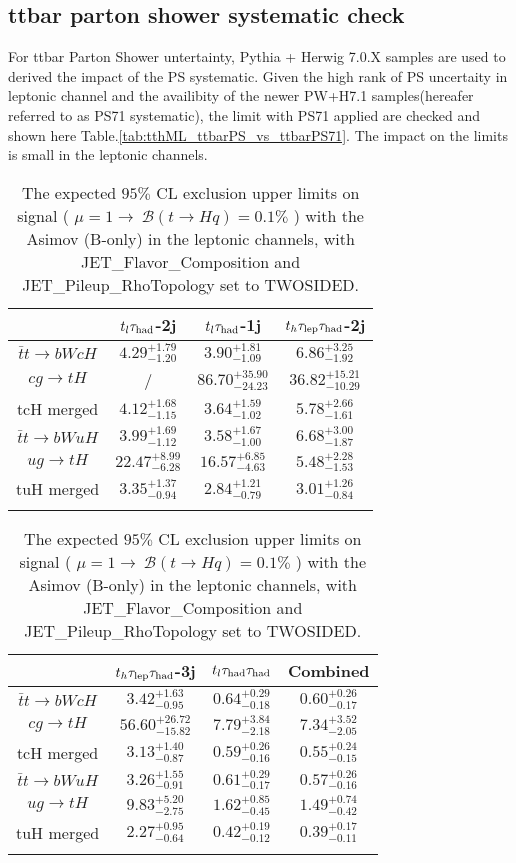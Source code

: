 \subsection{ ttbar parton shower systematic check}
For ttbar Parton Shower untertainty, Pythia + Herwig 7.0.X samples are used to derived the impact of the PS systematic. Given the high rank of PS uncertaity in leptonic channel and the availibity of the newer PW+H7.1 samples(hereafer referred to as PS71 systematic), the limit with PS71 applied are checked and shown here Table.\ref{tab:tthML_ttbarPS_vs_ttbarPS71}. The impact on the limits is small in the leptonic channels. 

\begin{table}[H]
\caption{The expected $95\%$ CL exclusion upper limits on signal ( $\mu=1\to~\mathcal{B}(t\to Hq)=0.1\%$ ) with the Asimov (B-only) in the leptonic channels,  with JET\_Flavor\_Composition and JET\_Pileup\_RhoTopology set to TWOSIDED.}
\label{tab:tthML_max_vs_twosided}
\centering
\begin{tabular}{cccc} \toprule\toprule
 & $t_l\tau_\text{had}$-2j & $t_l\tau_\text{had}$-1j & $t_h\tau_\text{lep}{}\tau_\text{had}$-2j\\\midrule
$\bar{t}t\to bWcH$ & $4.29^{+1.79}_{-1.20}$ & $3.90^{+1.81}_{-1.09}$ & $6.86^{+3.25}_{-1.92}$\\
$cg\to tH$ &  / & $86.70^{+35.90}_{-24.23}$ & $36.82^{+15.21}_{-10.29}$\\
tcH merged & $4.12^{+1.68}_{-1.15}$ & $3.64^{+1.59}_{-1.02}$ & $5.78^{+2.66}_{-1.61}$\\
$\bar{t}t\to bWuH$ & $3.99^{+1.69}_{-1.12}$ & $3.58^{+1.67}_{-1.00}$ & $6.68^{+3.00}_{-1.87}$\\
$ug\to tH$ & $22.47^{+8.99}_{-6.28}$ & $16.57^{+6.85}_{-4.63}$ & $5.48^{+2.28}_{-1.53}$\\
tuH merged & $3.35^{+1.37}_{-0.94}$ & $2.84^{+1.21}_{-0.79}$ & $3.01^{+1.26}_{-0.84}$\\
\bottomrule\bottomrule\\
\end{tabular}
\begin{tabular}{cccc} \toprule\toprule
 & $t_h\tau_\text{lep}{}\tau_\text{had}$-3j & $t_l\tau_\text{had}{}\tau_\text{had}$ & Combined\\\midrule
$\bar{t}t\to bWcH$ & $3.42^{+1.63}_{-0.95}$ & $0.64^{+0.29}_{-0.18}$ & $0.60^{+0.26}_{-0.17}$\\
$cg\to tH$ & $56.60^{+26.72}_{-15.82}$ & $7.79^{+3.84}_{-2.18}$ & $7.34^{+3.52}_{-2.05}$\\
tcH merged & $3.13^{+1.40}_{-0.87}$ & $0.59^{+0.26}_{-0.16}$ & $0.55^{+0.24}_{-0.15}$\\
$\bar{t}t\to bWuH$ & $3.26^{+1.55}_{-0.91}$ & $0.61^{+0.29}_{-0.17}$ & $0.57^{+0.26}_{-0.16}$\\
$ug\to tH$ & $9.83^{+5.20}_{-2.75}$ & $1.62^{+0.85}_{-0.45}$ & $1.49^{+0.74}_{-0.42}$\\
tuH merged & $2.27^{+0.95}_{-0.64}$ & $0.42^{+0.19}_{-0.12}$ & $0.39^{+0.17}_{-0.11}$\\
\bottomrule\bottomrule\\
\end{tabular}
\end{table}


